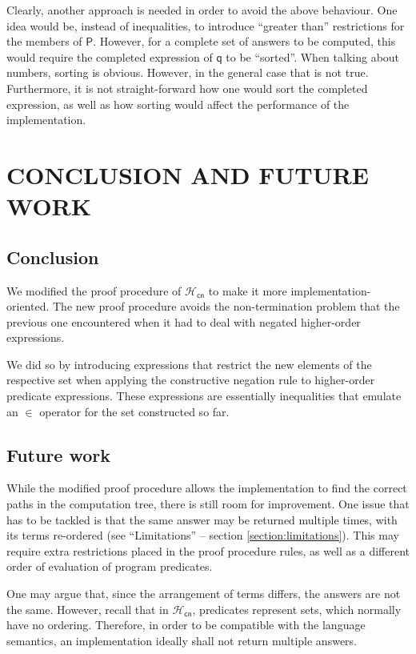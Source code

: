 \documentclass[inscr,ack,preface]{dithesis}
\theoremstyle{definition}
\newcommand{\hcn}{$\mathcal{H}_\mathsf{cn}$}
\newcommand{\msf}[1]{$\mathsf{#1}$}
\begin{document}
Clearly, another approach is needed in order to avoid the above behaviour. One idea would be, instead of inequalities, to introduce ``greater than'' restrictions for the members of \msf{P}. However, for a complete set of answers to be computed, this would require the completed expression of \msf{q} to be ``sorted''. When talking about numbers, sorting is obvious. However, in the general case that is not true. Furthermore, it is not straight-forward how one would sort the completed expression, as well as how sorting would affect the performance of the implementation.

\chapter{CONCLUSION AND FUTURE WORK}
\label{chap:conclusion}

\section{Conclusion}
We modified the proof procedure of \hcn{} to make it more implementation-oriented. The new proof procedure avoids the non-termination problem that the previous one encountered when it had to deal with negated higher-order expressions.

We did so by introducing expressions that restrict the new elements of the respective set when applying the constructive negation rule to higher-order predicate expressions. These expressions are essentially inequalities that emulate an $\in$ operator for the set constructed so far.

\section{Future work}
While the modified proof procedure allows the implementation to find the correct paths in the computation tree, there is still room for improvement. One issue that has to be tackled is that the same answer may be returned multiple times, with its terms re-ordered (see ``Limitations'' -- section \ref{section:limitations}). This may require extra restrictions placed in the proof procedure rules, as well as a different order of evaluation of program predicates.

One may argue that, since the arrangement of terms differs, the answers are not the same. However, recall that in \hcn{}, predicates represent sets, which normally have no ordering. Therefore, in order to be compatible with the language semantics, an implementation ideally shall not return multiple answers.
\end{document}
